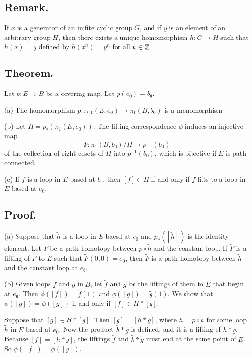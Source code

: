 \documentclass[titlepage]{article}
\begin{document}
\subsection{Remark.} If $x$ is a generator of an inifite cyclic group $G$, and if $y$ is an element of an arbitrary group $H$, then there exists a unique homomorphism $h: G \to H$ such that $h(x) = y$ defined by $h(x^{n}) = y^{n}$ for all $n \in \mathbb{Z}$.

\subsection{Theorem.} Let $p: E \to B$ be a covering map. Let $p(e_{0}) = b_{0}$.

(a) The homomorphism $p_{*}: \pi_{1}(E, e_{0}) \to \pi_{1}(B, b_{0})$ is a monomorphism

(b) Let $H = p_{*}(\pi_{1}(E, e_{0}))$. The lifting correspondence $\phi$ induces an injective map 
$$\Phi: \pi_{1}(B, b_{0}) / H \to p^{-1}(b_{0})$$
of the collection of right cosets of $H$ into $p^{-1}(b_{0})$, which is bijective if $E$ is path connected.

(c) If $f$ is a loop in $B$ based at $b_{0}$, then $[f] \in H$ if and only if $f$ lifts to a loop in $E$ based at $e_{0}$.

\subsection{Proof.}

(a) Suppose that $\tilde{h}$ is a loop in $E$ baesd at $e_{0}$ and $p_{*}([\tilde{h}])$ is the identity element. Let $F$ be a path homotopy between $p \circ \tilde{h}$ and the constant loop. If $\tilde{F}$ is a lifting of $F$ to $E$ such that $\tilde{F}(0, 0) = e_{0}$, then $\tilde{F}$ is a path homotopy between $\tilde{h}$ and the constant loop at $e_{0}$.

(b) Given loops $f$ and $g$ in $B$, let $\tilde{f}$ and $\tilde{g}$ be the liftings of them to $E$ that begin at $e_{0}$. Then $\phi([f]) = \tilde{f}(1)$ and $\phi([g]) = \tilde{g}(1)$. We show that $\phi([g]) = \phi([g])$ if and only if $[f] \in H * [g]$.

Suppose that $[g] \in H * [g]$. Then $[g] = [h * g]$, where $h = p \circ \tilde{h}$ for some loop $\tilde{h}$ in $E$ based at $e_{0}$. Now the product $\tilde{h} * \tilde{g}$ is defined, and it is a lifting of $h * g$. Because $[f] = [h * g]$, the liftings $\tilde{f}$ and $\tilde{h} * \tilde{g}$ must end at the same point of $E$. So $\phi([f]) = \phi([g])$.
\end{document}
